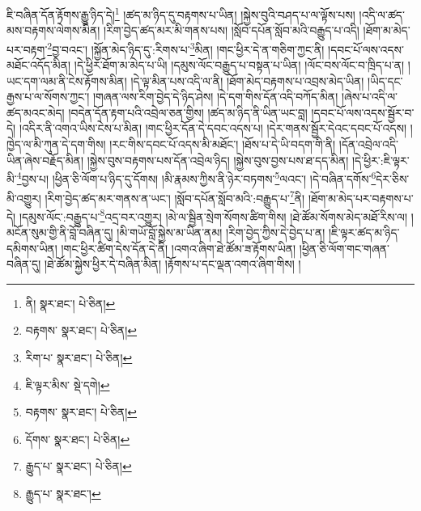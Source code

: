 ཇི་བཞིན་དོན་རྟོགས་རྒྱུ་ཉིད་དེ།\footnote{ནི།  སྣར་ཐང་།  པེ་ཅིན། } །ཚད་མ་ཉིད་དུ་བརྟགས་པ་ཡིན། །སྐྱེས་བུའི་བཤད་པ་ལ་ལྟོས་པས། །འདི་ལ་ཚད་མས་བརྟགས་ལེགས་མིན། །རིག་བྱེད་ཚད་མར་མི་གནས་པས། །སློབ་དཔོན་སློབ་མའི་བརྒྱུད་པ་འདི། །ཐོག་མ་མེད་པར་བརྟག་\footnote{བརྟགས་  སྣར་ཐང་།  པེ་ཅིན། }བྱ་བའང་། །སྐྱོན་མེད་ཉིད་དུ་:རིགས་པ་\footnote{རིག་པ་  སྣར་ཐང་།  པེ་ཅིན། }མིན། །གང་ཕྱིར་དེ་ན་གཅིག་ཀྱང་ནི། །དབང་པོ་ལས་འདས་མཐོང་འདོད་མིན། །དེ་ཕྱིར་ཐོག་མ་མེད་པ་ཡི། །དམུས་ལོང་བརྒྱུད་པ་བསྟན་པ་ཡིན། །ལོང་བས་ལོང་བ་ཁྲིད་པ་ན། །ཡང་དག་ལམ་ནི་ངེས་རྟོགས་མིན། །དེ་ལྟ་མིན་པས་འདི་ལ་ནི། །ཐོག་མེད་བརྟགས་པ་འབྲས་མེད་ཡིན། །ཡིད་དང་རྒྱས་པ་ལ་སོགས་ཀྱང་། །གཞན་ལས་རིག་བྱེད་དེ་ཉིད་ཤེས། །དེ་དག་གིས་དོན་འདི་བཀོད་མིན། །ཞེས་པ་འདི་ལ་ཚད་མའང་མེད། །བདེན་དོན་རྟག་པའི་འབྲེལ་ཅན་གྱིས། །ཚད་མ་ཉིད་ནི་ཡིན་ཡང་བླ། །དབང་པོ་ལས་འདས་སྦྱོར་བ་དེ། །འདིར་ནི་འགའ་ཡིས་ངེས་པ་མིན། །གང་ཕྱིར་དོན་དེ་དབང་འདས་པ། །དེར་གནས་སྦྱོར་དེའང་དབང་པོ་འདས། །ཁྱེད་ལ་མི་ཀུན་དེ་དག་གིས། །རང་གིས་དབང་པོ་འདས་མི་མཐོང་། །ཐོས་པ་དེ་ཡི་བདག་གི་ནི། །དོན་འབྲེལ་འདི་ཡིན་ཞེས་བརྗོད་མིན། །སྐྱེས་བུས་བརྟགས་པས་དོན་འབྲེལ་ཉིད། །སྐྱེས་བུས་བྱས་པས་ཐ་དད་མིན། །དེ་ཕྱིར་:ཇི་ལྟར་མི་\footnote{ཇི་ལྟར་མིས་  སྡེ་དགེ། }བྱས་པ། །ཕྱིན་ཅི་ལོག་པ་ཉིད་དུ་དོགས། །མི་རྣམས་ཀྱིས་ནི་ཉེར་བཏགས་\footnote{བརྟགས་  སྣར་ཐང་།  པེ་ཅིན། }ལའང་། །དེ་བཞིན་དགོས་\footnote{དོགས་  སྣར་ཐང་།  པེ་ཅིན། }དེར་ཅིས་མི་འགྱུར། །རིག་བྱེད་ཚད་མར་གནས་ན་ཡང་། །སློབ་དཔོན་སློབ་མའི་:བརྒྱུད་པ་\footnote{རྒྱུད་པ་  སྣར་ཐང་།  པེ་ཅིན། }ནི། །ཐོག་མ་མེད་པར་བརྟགས་པ་དེ། །དམུས་ལོང་:བརྒྱུད་པ་\footnote{རྒྱུད་པ་  སྣར་ཐང་། }འདྲ་བར་འགྱུར། །མེ་ལ་སྦྱིན་སྲེག་སོགས་ཚིག་གིས། །ཐེ་ཚོམ་སོགས་མེད་མཐོ་རིས་ལ། །མངོན་སུམ་གྱི་ནི་བློ་བཞིན་དུ། །མི་གཡོ་བློ་སྐྱེས་མ་ཡིན་ནམ། །རིག་བྱེད་ཀྱིས་དེ་བྱེད་པ་ན། །ཇི་ལྟར་ཚད་མ་ཉིད་དམིགས་ཡིན། །གང་ཕྱིར་ཚིག་དེས་དོན་དེ་ནི། །འགའ་ཞིག་ཐེ་ཚོམ་ཟ་རྟོགས་ཡིན། །ཕྱིན་ཅི་ལོག་གང་གཞན་བཞིན་དུ། །ཐེ་ཚོམ་སྐྱེས་ཕྱིར་དེ་བཞིན་མིན། །རྟོགས་པ་དང་ལྡན་འགའ་ཞིག་གིས། །
